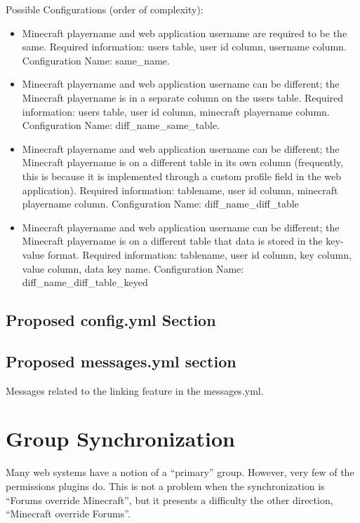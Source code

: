 \documentclass[letterpaper,12pt]{article}
\begin{document}
  Possible Configurations (order of complexity):
  \begin{itemize}
    \item Minecraft playername and web application username are required to be
      the same. Required information: users table, user id column, username
      column. Configuration Name: same\_name.
    \item Minecraft playername and web application username can be different;
      the Minecraft playername is in a separate column on the users table.
      Required information: users table, user id column, minecraft playername
      column. Configuration Name: diff\_name\_same\_table.
    \item Minecraft playername and web application username can be different;
      the Minecraft playername is on a different table in its own column
      (frequently, this is because it is implemented through a custom profile
      field in the web application). Required information: tablename, user id
      column, minecraft playername column.
      Configuration Name: diff\_name\_diff\_table
    \item Minecraft playername and web application username can be different;
      the Minecraft playername is on a different table that data is stored in
      the key-value format. Required information: tablename, user id column,
      key column, value column, data key name.
      Configuration Name: diff\_name\_diff\_table\_keyed
  \end{itemize}
  \clearpage
  
  \subsection{Proposed config.yml Section}
  
  
  \subsection{Proposed messages.yml section}
  Messages related to the linking feature in the messages.yml.
  

  \clearpage
  \section{Group Synchronization}
Many web systems have a notion of a ``primary'' group. However, very few of the
permissions plugins do. This is not a problem when the synchronization is
``Forums override Minecraft'', but it presents a difficulty the other direction,
``Minecraft override Forums''.
\end{document}
